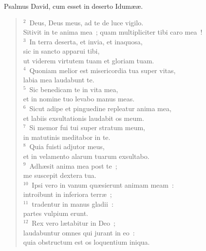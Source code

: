 \bchapter
\lettrine[lines=3,image=true,loversize=0.05,lraise=-0.03]{P}{}salmus David, cum esset in deserto Idum\ae \ae .
\begin{flushleft}\begin{verse}\vspace{6pt}${}^{2}$~Deus, Deus meus, ad te de luce vigilo.\\ Sitivit in te anima mea~; quam multipliciter tibi caro mea~!\\
${}^{3}$~In terra deserta, et invia, et inaquosa,\\ sic in sancto apparui tibi,\\ ut viderem virtutem tuam et gloriam tuam.\\
${}^{4}$~Quoniam melior est misericordia tua super vitas,\\ labia mea laudabunt te.\\
${}^{5}$~Sic benedicam te in vita mea,\\ et in nomine tuo levabo manus meas.\\
${}^{6}$~Sicut adipe et pinguedine repleatur anima mea,\\ et labiis exsultationis laudabit os meum.\\
${}^{7}$~Si memor fui tui super stratum meum,\\ in matutinis meditabor in te.\\
${}^{8}$~Quia fuisti adjutor meus,\\ et in velamento alarum tuarum exsultabo.\\
${}^{9}$~Adh\ae sit anima mea post te~;\\ me suscepit dextera tua.\\
${}^{10}$~Ipsi vero in vanum qu\ae sierunt animam meam~:\\ introibunt in inferiora terr\ae~;\\
${}^{11}$~tradentur in manus gladii~:\\ partes vulpium erunt.\\
${}^{12}$~Rex vero l\ae tabitur in Deo~;\\ laudabuntur omnes qui jurant in eo~:\\ quia obstructum est os loquentium iniqua.\end{verse}\end{flushleft}



